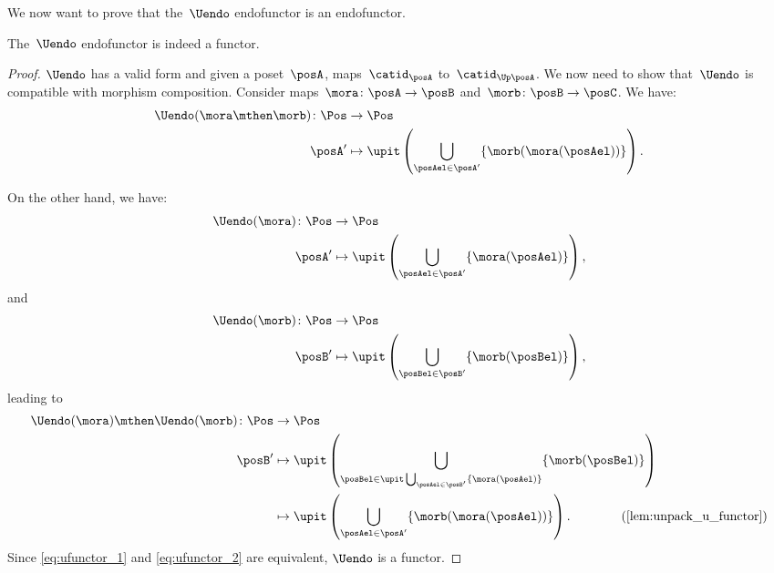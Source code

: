 We now want to prove that the~$\Uendo$ endofunctor is an endofunctor.

\begin{lemma}
    \label{lem:Uendo-is-functor}
    The~$\Uendo$ endofunctor is indeed a functor.
\end{lemma}

\begin{proof}
    $\Uendo$ has a valid form and given a poset~$\posA$, maps~$\catid_\posA$ to~$\catid_{\Up \posA}$.
    We now need to show that~$\Uendo$ is compatible with morphism composition. Consider maps~$\mora\colon \posA \to \posB$ and~$\morb\colon \posB \to \posC$. We have:
    \begin{equation}
        \label{eq:ufunctor_1}
        \begin{aligned}
            \Uendo(\mora\mthen \morb)\colon \Pos &\to \Pos\\
            \posA'&\mapsto \upit \left( \bigcup_{\posAel\in \posA'} \{\morb(\mora(\posAel))\}\right).
        \end{aligned}
    \end{equation}

    On the other hand, we have:
    \begin{equation}
        \begin{aligned}
            \Uendo(\mora)\colon \Pos &\to \Pos\\
            \posA'&\mapsto \upit \left( \bigcup_{\posAel\in \posA'}\{\mora(\posAel)\}\right),
        \end{aligned}
    \end{equation}
    and
    \begin{equation}
        \begin{aligned}
            \Uendo(\morb)\colon \Pos &\to \Pos\\
            \posB'&\mapsto \upit \left( \bigcup_{\posBel\in \posB'}\{\morb(\posBel)\}\right),
        \end{aligned}
    \end{equation}
    leading to
    \begin{equation}
        \label{eq:ufunctor_2}
        \begin{aligned}
            \Uendo(\mora)\mthen \Uendo(\morb)\colon \Pos &\to \Pos\\
            \posB'&\mapsto \upit\left( \bigcup_{\posBel\in \upit \bigcup_{\posAel\in \posB'}\{\mora(\posAel)\}}\{\morb(\posBel)\}\right)\\
            &\mapsto \upit \left(\bigcup_{\posAel\in \posA'} \{ \morb(\mora(\posAel))\}\right). \qquad \qquad (\cref{lem:unpack_u_functor})
        \end{aligned}
    \end{equation}
    Since \cref{eq:ufunctor_1} and \cref{eq:ufunctor_2} are equivalent, $\Uendo$ is a functor.
\end{proof}
